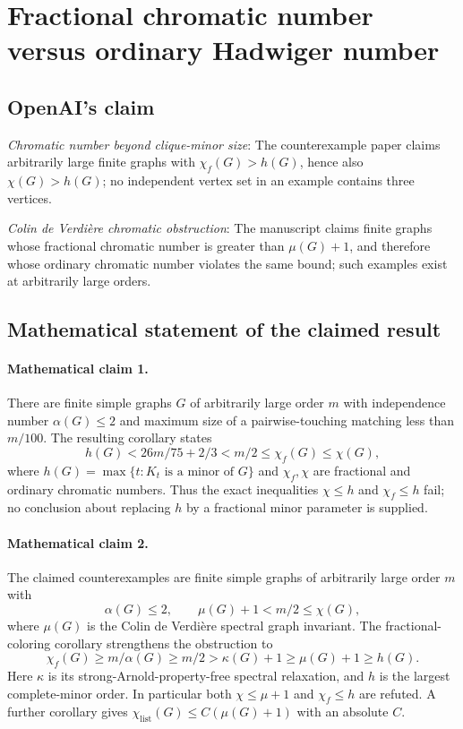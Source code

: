 \documentclass[11pt]{article}
\begin{document}
\section*{Fractional chromatic number versus ordinary Hadwiger number}

\subsection{OpenAI's claim}
\textit{Chromatic number beyond clique-minor size}: The counterexample paper claims arbitrarily large finite graphs with $\chi_f(G)>h(G)$, hence also $\chi(G)>h(G)$; no independent vertex set in an example contains three vertices.

\textit{Colin de Verdière chromatic obstruction}: The manuscript claims finite graphs whose fractional chromatic number is greater than $\mu(G)+1$, and therefore whose ordinary chromatic number violates the same bound; such examples exist at arbitrarily large orders.

\subsection{Mathematical statement of the claimed result}
\paragraph{Mathematical claim 1.} There are finite simple graphs $G$ of arbitrarily large order $m$ with independence number $\alpha(G)\le2$ and maximum size of a pairwise-touching matching less than $m/100$. The resulting corollary states \[h(G)<26m/75+2/3<m/2\le\chi_f(G)\le\chi(G),\] where $h(G)=\max\{t:K_t\text{ is a minor of }G\}$ and $\chi_f,\chi$ are fractional and ordinary chromatic numbers. Thus the exact inequalities $\chi\le h$ and $\chi_f\le h$ fail; no conclusion about replacing $h$ by a fractional minor parameter is supplied.

\paragraph{Mathematical claim 2.} The claimed counterexamples are finite simple graphs of arbitrarily large order $m$ with \[\alpha(G)\le2,\qquad\mu(G)+1<m/2\le\chi(G),\] where $\mu(G)$ is the Colin de Verdi\`ere spectral graph invariant. The fractional-coloring corollary strengthens the obstruction to \[\chi_f(G)\ge m/\alpha(G)\ge m/2>\kappa(G)+1\ge\mu(G)+1\ge h(G).\] Here $\kappa$ is its strong-Arnold-property-free spectral relaxation, and $h$ is the largest complete-minor order. In particular both $\chi\le\mu+1$ and $\chi_f\le h$ are refuted. A further corollary gives $\chi_{\mathrm{list}}(G)\le C(\mu(G)+1)$ with an absolute $C$.
\end{document}
